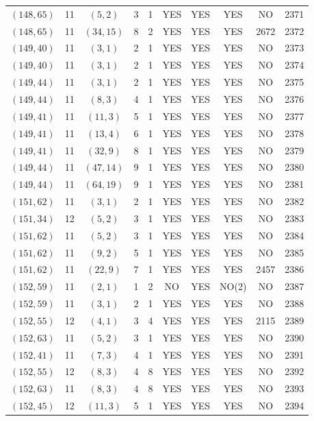 \begin{longtable}{|c|c|c|c|c|c|c|c|c|c|}
$(148, 65)$ & 11 & $(5, 2)$ & 3 & 1 & YES & YES & YES & NO & 2371\\
$(148, 65)$ & 11 & $(34, 15)$ & 8 & 2 & YES & YES & YES & 2672 & 2372\\
$(149, 40)$ & 11 & $(3, 1)$ & 2 & 1 & YES & YES & YES & NO & 2373\\
$(149, 40)$ & 11 & $(3, 1)$ & 2 & 1 & YES & YES & YES & NO & 2374\\
$(149, 44)$ & 11 & $(3, 1)$ & 2 & 1 & YES & YES & YES & NO & 2375\\
$(149, 44)$ & 11 & $(8, 3)$ & 4 & 1 & YES & YES & YES & NO & 2376\\
$(149, 41)$ & 11 & $(11, 3)$ & 5 & 1 & YES & YES & YES & NO & 2377\\
$(149, 41)$ & 11 & $(13, 4)$ & 6 & 1 & YES & YES & YES & NO & 2378\\
$(149, 41)$ & 11 & $(32, 9)$ & 8 & 1 & YES & YES & YES & NO & 2379\\
$(149, 44)$ & 11 & $(47, 14)$ & 9 & 1 & YES & YES & YES & NO & 2380\\
$(149, 44)$ & 11 & $(64, 19)$ & 9 & 1 & YES & YES & YES & NO & 2381\\
$(151, 62)$ & 11 & $(3, 1)$ & 2 & 1 & YES & YES & YES & NO & 2382\\
$(151, 34)$ & 12 & $(5, 2)$ & 3 & 1 & YES & YES & YES & NO & 2383\\
$(151, 62)$ & 11 & $(5, 2)$ & 3 & 1 & YES & YES & YES & NO & 2384\\
$(151, 62)$ & 11 & $(9, 2)$ & 5 & 1 & YES & YES & YES & NO & 2385\\
$(151, 62)$ & 11 & $(22, 9)$ & 7 & 1 & YES & YES & YES & 2457 & 2386\\
$(152, 59)$ & 11 & $(2, 1)$ & 1 & 2 & NO & YES & NO(2) & NO & 2387\\
$(152, 59)$ & 11 & $(3, 1)$ & 2 & 1 & YES & YES & YES & NO & 2388\\
$(152, 55)$ & 12 & $(4, 1)$ & 3 & 4 & YES & YES & YES & 2115 & 2389\\
$(152, 63)$ & 11 & $(5, 2)$ & 3 & 1 & YES & YES & YES & NO & 2390\\
$(152, 41)$ & 11 & $(7, 3)$ & 4 & 1 & YES & YES & YES & NO & 2391\\
$(152, 55)$ & 12 & $(8, 3)$ & 4 & 8 & YES & YES & YES & NO & 2392\\
$(152, 63)$ & 11 & $(8, 3)$ & 4 & 8 & YES & YES & YES & NO & 2393\\
$(152, 45)$ & 12 & $(11, 3)$ & 5 & 1 & YES & YES & YES & NO & 2394\\

\end{longtable}
